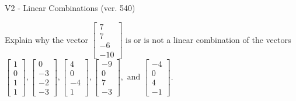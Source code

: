 \begin{exercise}
  \begin{exerciseTitle}V2 - Linear Combinations (ver. 540)\end{exerciseTitle}
  \begin{exerciseStatement}
    Explain why the vector \(\left[\begin{array}{c}
7 \\
7 \\
-6 \\
-10
\end{array}\right]\)  is or is not a linear 
	combination of the vectors \(\left[\begin{array}{c}
1 \\
0 \\
1 \\
1
\end{array}\right] , \left[\begin{array}{c}
0 \\
-3 \\
-2 \\
-3
\end{array}\right] , \left[\begin{array}{c}
4 \\
0 \\
-4 \\
1
\end{array}\right] , \left[\begin{array}{c}
-9 \\
0 \\
7 \\
-3
\end{array}\right] , \text{ and } \left[\begin{array}{c}
-4 \\
0 \\
4 \\
-1
\end{array}\right]\).
	



\end{exerciseStatement}
\end{exercise}
